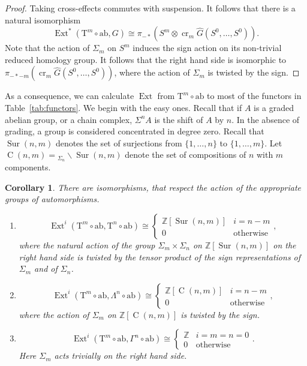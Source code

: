 \documentclass[psamsfonts]{amsart}
\theoremstyle{plain}
\newtheorem{cor}[thm]{Corollary}
\theoremstyle{definition}
\theoremstyle{remark}
\newcommand{\Z}{\mathbb{Z}}
\newcommand{\abelianization}{\mathrm{ab}}
\newcommand{\tensor}{\mathrm{T}}
\DeclareMathOperator{\ext}{Ext}
\DeclareMathOperator{\sur}{Sur}
\DeclareMathOperator{\Part}{\rho}
\DeclareMathOperator{\Comp}{C}
\DeclareMathOperator{\ce}{cr}
\begin{document}
\begin{proof}
Taking cross-effects commutes with suspension. It follows that there is a natural isomorphism
\[
\ext^*(\tensor^m\circ \abelianization, G)\cong \pi_{-*}(S^m\otimes \ce_m\widehat G(S^0, \ldots, S^0)).
\]
Note that the action of $\Sigma_m$ on $S^m$ induces the sign action on its non-trivial reduced homology group. It follows that the right hand side is isomorphic to
$\pi_{-*-m}(\ce_m\widehat G(S^0, \ldots, S^0))$, where the action of $\Sigma_m$ is twisted by the sign.
\end{proof}
As a consequence, we can calculate $\ext$ from $\tensor^m \circ \abelianization$ to most of the functors in Table~\ref{tab:functors}. We begin with the easy ones. Recall that if $A$ is a graded abelian group, or a chain complex, $\Sigma^n A$ is the shift of $A$ by $n$. In the absence of grading, a group is considered concentrated in degree zero. Recall that $\sur(n, m)$ denotes the set of surjections from $\{1, \ldots, n\}$ to $\{1, \ldots, m\}$. %
Let $\Comp(n, m)={_{\Sigma_n}}\!\backslash\sur(n, m)$ denote the set of compositions of $n$ with $m$ components.
\begin{cor}\label{cor: tensor-others}
There are isomorphisms, that respect the action of the appropriate groups of automorphisms.
\begin{enumerate}
    \item \[\ext^i(\tensor^m \circ \abelianization, \tensor^n \circ \abelianization)\cong \left\{\begin{array}{cl} \Z[\sur(n, m)] & i=n-m \\ 0 & \mbox{otherwise}\end{array} \right.,\] \label{item:tensor-tensor}
    where the natural action of the group $\Sigma_m\times\Sigma_n$ on $\Z[\sur(n,m)]$ on the right hand side is twisted by the tensor product of the sign representations of $\Sigma_m$ and of $\Sigma_n$.
    \item \[
    \ext^i(\tensor^m\circ \abelianization, \Lambda^n \circ \abelianization)\cong \left\{ \begin{array}{cl} \Z[\Comp(n, m)] & i=n-m\\ 0 & \mbox{otherwise} \end{array}\right.,\]\label{item:tensor-exterior}
where the action of $\Sigma_m$ on $\Z[\Comp(n, m)]$ is twisted by the sign.
       \item \[\ext^i(\tensor^m\circ \abelianization, \Gamma^n\circ \abelianization) \cong \left\{\begin{array}{cl} \Z & i=m=n=0\\ 0 & \mbox{otherwise}\end{array}\right.. 
       \] \label{item:tensor-dividedP} 
       Here $\Sigma_m$ acts trivially on the right hand side.
\end{enumerate}
\end{cor}
\end{document}
